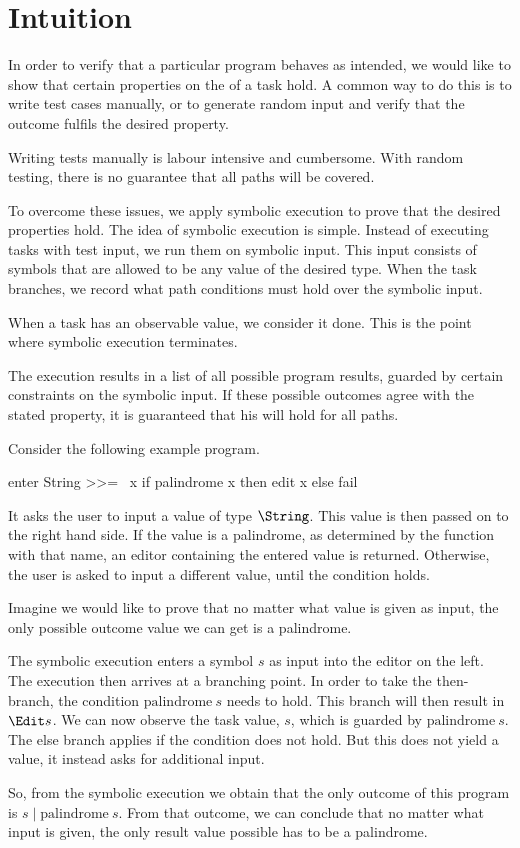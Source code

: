 


\section{Intuition}
\label{sec:intuition}

In order to verify that a particular \TOPHAT program behaves as intended,
we would like to show that certain properties on the of a task hold.
A common way to do this is to write test cases manually,
or to generate random input and verify that the outcome fulfils the desired property.

Writing tests manually is labour intensive and cumbersome.
With random testing, there is no guarantee that all paths will be covered.

To overcome these issues, we apply symbolic execution to prove that the desired properties hold.
The idea of symbolic execution is simple.
Instead of executing tasks with test input, we run them on symbolic input.
This input consists of symbols that are allowed to be any value of the desired type.
When the task branches, we record what path conditions must hold over the symbolic input.

When a task has an observable value, we consider it done.
This is the point where symbolic execution terminates.

The execution results in a list of all possible program results,
guarded by certain constraints on the symbolic input.
If these possible outcomes agree with the stated property,
it is guaranteed that his will hold for all paths.

\begin{example}
Consider the following example program.

\begin{TASK}
  enter String >>= \ x if palindrome x then edit x else fail
\end{TASK}

It asks the user to input a value of type $\String$.
This value is then passed on to the right hand side.
If the value is a palindrome, as determined by the function with that name,
an editor containing the entered value is returned.
Otherwise, the user is asked to input a different value, until the condition holds.

Imagine we would like to prove that no matter what value is given as input,
the only possible outcome value we can get is a palindrome.

The symbolic execution enters a symbol $s$ as input into the editor on the left.
The execution then arrives at a branching point.
In order to take the then-branch, the condition $\text{palindrome}\ s$ needs to hold.
This branch will then result in $\Edit s$.
We can now observe the task value, $s$, which is guarded by $\text{palindrome}\ s$.
The else branch applies if the condition does not hold.
But this does not yield a value, it instead asks for additional input.

So, from the symbolic execution we obtain that the only outcome of this program is $s \mid \text{palindrome}\ s$.
From that outcome, we can conclude that no matter what input is given, the only result value possible has to be a palindrome.
\end{example}
